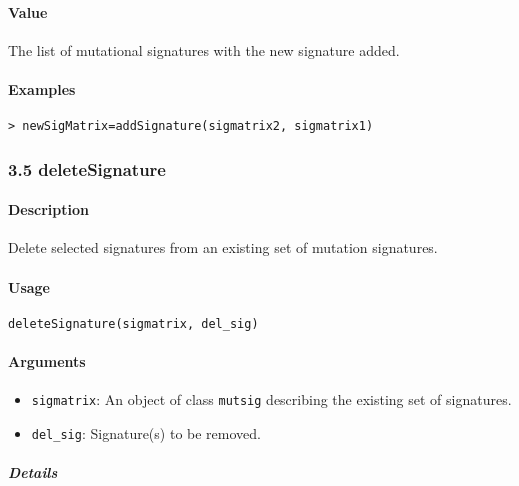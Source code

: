 \documentclass[]{article}
\providecommand{\tightlist}{%
  \setlength{\itemsep}{0pt}\setlength{\parskip}{0pt}}
\let\oldparagraph\paragraph
\renewcommand{\paragraph}[1]{\oldparagraph{#1}\mbox{}}
\let\oldsubparagraph\subparagraph
\renewcommand{\subparagraph}[1]{\oldsubparagraph{#1}\mbox{}}
\begin{document}
\paragraph{\texorpdfstring{\textbf{Value}}{Value}}\label{value-1}

The list of mutational signatures with the new signature added.

\paragraph{\texorpdfstring{\textbf{Examples}}{Examples}}\label{examples-3}

\begin{verbatim}
> newSigMatrix=addSignature(sigmatrix2, sigmatrix1)
\end{verbatim}

\subsubsection{3.5 deleteSignature}\label{deletesignature}

\paragraph{\texorpdfstring{\textbf{Description}}{Description}}\label{description-4}

Delete selected signatures from an existing set of mutation signatures.

\paragraph{\texorpdfstring{\textbf{Usage}}{Usage}}\label{usage-4}

\texttt{deleteSignature(sigmatrix,\ del\_sig)}

\paragraph{\texorpdfstring{\textbf{Arguments
}}{Arguments }}\label{arguments-3}

\begin{itemize}
\tightlist
\item
  \texttt{sigmatrix}: An object of class \texttt{mutsig} describing the
  existing set of signatures.
\item
  \texttt{del\_sig}: Signature(s) to be removed.
\end{itemize}

\subparagraph{\texorpdfstring{\textbf{Details}}{Details}}\label{details-3}
\end{document}
